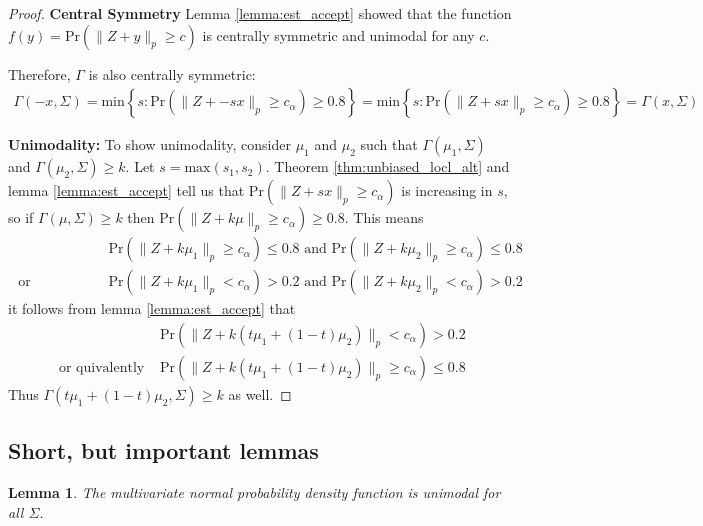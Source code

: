 \documentclass{article}
\newtheorem{lemma}[theorem]{Lemma}
\begin{document}
\begin{proof}
\textbf{Central Symmetry}
	Lemma \ref{lemma:est_accept} showed that the function $f(y) =  \text{Pr}(\|Z + y\|_p \geq c)$ is centrally symmetric and unimodal for any $c$.  

	Therefore, $\Gamma$ is also centrally symmetric:
	\begin{align*}
		\Gamma(-x, \Sigma) = \text{min}\left\{s : \text{Pr}(\|Z + -sx\|_p \geq c_\alpha) \geq 0.8 \right\} = \text{min}\left\{s : \text{Pr}(\|Z + sx\|_p \geq c_\alpha) \geq 0.8 \right\} = \Gamma(x, \Sigma)
	\end{align*}

	\textbf{Unimodality: }
	To show unimodality, consider $\mu_1$ and $\mu_2$ such that $\Gamma(\mu_1, \Sigma)$ and $\Gamma(\mu_2, \Sigma) \geq k$.  Let $s = \text{max}(s_1, s_2)$.  Theorem \ref{thm:unbiased_locl_alt} and lemma \ref{lemma:est_accept} tell us that $\text{Pr}(\|Z + sx\|_p \geq c_\alpha)$ is increasing in $s$, so if $\Gamma(\mu, \Sigma) \geq k$ then $\text{Pr}(\|Z + k\mu\|_p \geq c_\alpha) \geq 0.8$.  This means 
	\begin{align*}
		&\text{Pr}(\|Z + k\mu_1\|_p \geq c_\alpha) \leq 0.8 \text{ and } \text{Pr}(\|Z + k\mu_2\|_p \geq c_\alpha) \leq 0.8\\
		\text{ or equivalently }& \text{Pr}(\|Z + k\mu_1\|_p < c_\alpha) > 0.2 \text{ and } \text{Pr}(\|Z + k\mu_2\|_p < c_\alpha) > 0.2
	\end{align*}
	it follows from lemma \ref{lemma:est_accept} that 
	\begin{align*}
		&\text{Pr}(\|Z + k (t\mu_1 + (1 - t)\mu_2)\|_p < c_\alpha) > 0.2\\
	\text{ or quivalently }	&\text{Pr}(\|Z + k (t\mu_1 + (1 - t)\mu_2)\|_p \geq c_\alpha) \leq 0.8
	\end{align*}
	Thus $\Gamma(t\mu_1 + (1 - t)\mu_2, \Sigma) \geq k$ as well.
\end{proof}

\subsection{Short, but important lemmas}

\begin{lemma}
	\label{lemma:mvtnorm_unimodality}
	The multivariate normal probability density function is unimodal for all $\Sigma$.  
\end{lemma}
\end{document}
